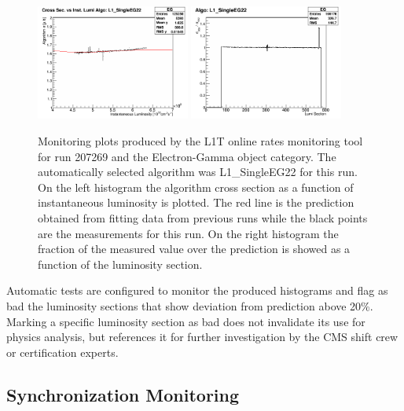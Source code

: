 \begin{figure}[!htb]
\centering
\includegraphics[width=0.45\textwidth]{Chapter03/L1TOnline/Images/L1TDQM_Online_Run207269_L1TRate_TriggerCrossSections_EG.png}
\includegraphics[width=0.45\textwidth]{Chapter03/L1TOnline/Images/L1TDQM_Online_Run207269_L1TRate_Certification_EG.png}
\caption{Monitoring plots produced by the \gls{L1T} online rates monitoring tool for run 207269 and the Electron-Gamma object category. The automatically selected algorithm was L1\_SingleEG22 for this run. On the left histogram  the algorithm cross section as a function of instantaneous luminosity is plotted. The red line is the prediction obtained from fitting data from previous runs while the black points are the measurements for this run. On the right histogram the fraction of the measured value over the prediction is showed as a function of the luminosity section.}
\label{FIGURE:TechnicalWork_RateMonitoring}
\end{figure}

Automatic tests are configured to monitor the produced histograms and flag as bad the luminosity sections that show deviation from prediction above 20\%. Marking a specific luminosity section as bad does not invalidate its use for physics analysis, but references it for further investigation by the \gls{CMS} shift crew or certification experts.

\subsection{Synchronization Monitoring}
\label{SECTION:TechnicalWork_L1TDQM_SynchronizationMonitoring}


